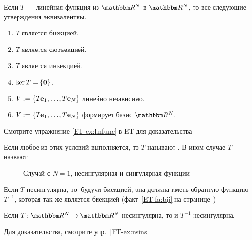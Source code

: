 \begin{frame}

    \vspace{2em}
    \Thm {\eqref{ET-t:linfunc}}
        Если $T$ --- линейная функция из $\RR^N$ в $\RR^N$, то 
        все следующие утверждения эквивалентны:
        \begin{enumerate}
            \item $T$ является биекцией.
            \item $T$ является сюръекцией.
            \item $T$ является инъекцией.
            \item $\operatorname{ker} T = \{ {\mathbf 0} \}$.
            \item $V := \{T{\mathbf e}_1, \ldots, T{\mathbf e}_N\}$ линейно независимо.
            \item $V := \{T{\mathbf e}_1, \ldots, T{\mathbf e}_N\}$ формирует базис $\RR^N$.
        \end{enumerate}
    Смотрите упражнение \ref{ET-ex:linfunc} в ET для доказательства
    
    \vspace{.7em}
    Если любое из этих условий выполняется, то $T$ называют
    . В ином случае $T$ назвают 
    
\end{frame}

\begin{frame}

    \begin{figure}
       \begin{center}
        \caption{Случай с $N=1$, несингулярная и сингулярная функции}
       \end{center}
    \end{figure}
    
\end{frame}

\begin{frame}
    
    \vspace{2em}
    Если $T$ несингулярна, то, будучи биекцией, она должна иметь обратную
    функцию $T^{-1}$, которая так же является биекцией (факт~\ref{ET-fa:bij} на
    странице~\pageref{ET-fa:bij})

    \vspace{.7em}
    \Fact{\eqref{ET-fa:nsins}}
        Если $T \colon \RR^N \to \RR^N$ несингулярна, то и $T^{-1}$ несингулярна.  

    Для доказательства, смотрите упр.~\ref{ET-ex:nsins}
    
\end{frame}

